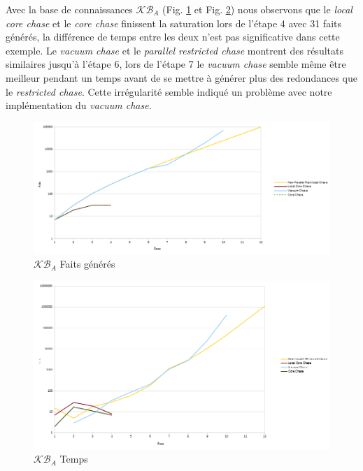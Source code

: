 Avec la base de connaissances $\mathcal{KB}_A$ (Fig. \ref{fig:ex0newfacts} et  Fig. \ref{fig:ex0newtime}) nous observons que le \textit{local core chase} et le \textit{core chase} finissent la saturation lors de l'étape 4 avec 31 faits générés, la différence de temps entre les deux n'est pas significative dans cette exemple. Le \textit{vacuum chase} et le \textit{parallel restricted chase} montrent des résultats similaires jusqu'à l'étape 6, lors de l'étape 7 le \textit{vacuum chase} semble même être meilleur pendant un temps avant de se mettre à générer plus des redondances que le \textit{restricted chase}. Cette irrégularité semble indiqué un problème avec notre implémentation du \textit{vacuum chase}. 

\begin{figure}
\centering
\includegraphics[width=\textwidth]{pictures/benchmark_new/ex0newfacts.png}
\caption{$\mathcal{KB}_A$ Faits générés}
\label{fig:ex0newfacts}
\end{figure}

\begin{figure}
\centering
\includegraphics[width=\textwidth]{pictures/benchmark_new/ex0newtime.png}
\caption{$\mathcal{KB}_A$ Temps}
\label{fig:ex0newtime}
\end{figure}

